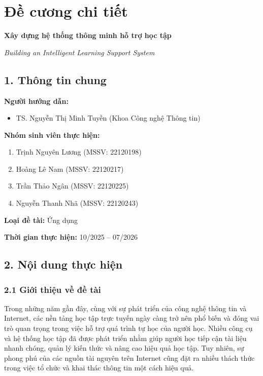 \chapter*{Đề cương chi tiết}

\begin{center}
    {\LARGE \bfseries Xây dựng hệ thống thông minh hỗ trợ học tập\par}

    \vspace{0.3cm}
    {\large \itshape Building an Intelligent Learning Support System\par}
\end{center}

\section*{1. Thông tin chung}

\textbf{Người hướng dẫn:}
\begin{itemize}
    \item TS. Nguyễn Thị Minh Tuyền (Khoa Công nghệ Thông tin)
\end{itemize}

\textbf{Nhóm sinh viên thực hiện:}
\begin{enumerate}
    \item Trịnh Nguyên Lương (MSSV: 22120198)
    \item Hoàng Lê Nam (MSSV: 22120217)
    \item Trần Thảo Ngân (MSSV: 22120225)
    \item Nguyễn Thanh Nhã (MSSV: 22120243)
\end{enumerate}

\textbf{Loại đề tài:} Ứng dụng

\textbf{Thời gian thực hiện:} 10/2025 -- 07/2026

\section*{2. Nội dung thực hiện}

\subsection*{2.1 Giới thiệu về đề tài}

Trong những năm gần đây, cùng với sự phát triển của công nghệ thông tin và Internet, các nền tảng học tập trực tuyến ngày càng trở nên phổ biến và đóng vai trò quan trọng trong việc hỗ trợ quá trình tự học của người học. Nhiều công cụ và hệ thống học tập đã được phát triển nhằm giúp người học tiếp cận tài liệu nhanh chóng, quản lý kiến thức và nâng cao hiệu quả học tập. Tuy nhiên, sự phong phú của các nguồn tài nguyên trên Internet cũng đặt ra nhiều thách thức trong việc tổ chức và khai thác thông tin một cách hiệu quả.

